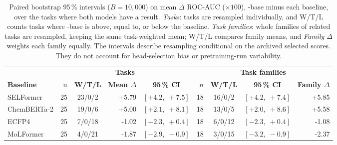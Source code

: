 \begin{table}[htbp]
  \centering\small
  \setlength{\tabcolsep}{3pt}
  \begin{tabular}{l r c r c r c c r}
    \toprule
    & \multicolumn{4}{c}{\textbf{Tasks}} & \multicolumn{4}{c}{\textbf{Task families}} \\
    \cmidrule(lr){2-5}\cmidrule(lr){6-9}
    \textbf{Baseline} & $n$ & \textbf{W/T/L} & \textbf{Mean $\Delta$} & \textbf{95\,\% CI} & $n$ & \textbf{W/T/L} & \textbf{95\,\% CI} & \textbf{Family $\Delta$} \\
    \midrule
    SELFormer & 25 & 23/0/2 & +5.79 & $[+4.2,\;+7.5]$ & 18 & 16/0/2 & $[+4.2,\;+7.4]$ & +5.85 \\
    ChemBERTa-2 & 25 & 19/0/6 & +5.00 & $[+2.1,\;+8.1]$ & 18 & 13/0/5 & $[+2.0,\;+8.6]$ & +5.58 \\
    ECFP4 & 25 & 7/0/18 & -1.02 & $[-2.3,\;+0.4]$ & 18 & 6/0/12 & $[-2.3,\;+0.4]$ & -1.08 \\
    MoLFormer & 25 & 4/0/21 & -1.87 & $[-2.9,\;-0.9]$ & 18 & 3/0/15 & $[-3.2,\;-0.9]$ & -2.37 \\
    \bottomrule
  \end{tabular}
  \caption{%
    Paired bootstrap 95\,\% intervals ($B=10{,}000$) on mean $\Delta$ ROC-AUC
    ($\times100$), \model{}-base minus each baseline, over the tasks where both
    models have a result. \emph{Tasks}: tasks are resampled individually, and
    W/T/L counts tasks where \model{}-base is above, equal to, or below the baseline.
    \emph{Task families}: whole families of related tasks are resampled, keeping
    the same task-weighted mean; W/T/L compares family means, and
    \emph{Family $\Delta$} weights each family equally.
    The intervals describe resampling conditional on the archived selected scores. They do not account for head-selection bias or pretraining-run variability.
  }%
  \label{tab:bootstrap-cis}
\end{table}

